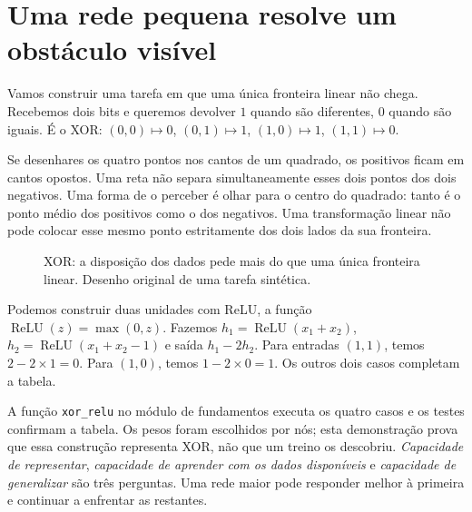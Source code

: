 \section{Uma rede pequena resolve um obstáculo visível}
Vamos construir uma tarefa em que uma única fronteira linear não chega. Recebemos dois bits e queremos devolver $1$ quando são diferentes, $0$ quando são iguais. É o XOR: $(0,0)\mapsto0$, $(0,1)\mapsto1$, $(1,0)\mapsto1$, $(1,1)\mapsto0$.

Se desenhares os quatro pontos nos cantos de um quadrado, os positivos ficam em cantos opostos. Uma reta não separa simultaneamente esses dois pontos dos dois negativos. Uma forma de o perceber é olhar para o centro do quadrado: tanto é o ponto médio dos positivos como o dos negativos. Uma transformação linear não pode colocar esse mesmo ponto estritamente dos dois lados da sua fronteira.

\begin{figure}[htbp]
\centering
{}
\caption{XOR: a disposição dos dados pede mais do que uma única fronteira linear. Desenho original de uma tarefa sintética.}
\end{figure}

Podemos construir duas unidades com ReLU, a função $\operatorname{ReLU}(z)=\max(0,z)$. Fazemos $h_1=\operatorname{ReLU}(x_1+x_2)$, $h_2=\operatorname{ReLU}(x_1+x_2-1)$ e saída $h_1-2h_2$. Para entradas $(1,1)$, temos $2-2\times1=0$. Para $(1,0)$, temos $1-2\times0=1$. Os outros dois casos completam a tabela.

A função \texttt{xor\_relu} no módulo de fundamentos executa os quatro casos e os testes confirmam a tabela. Os pesos foram escolhidos por nós; esta demonstração prova que essa construção representa XOR, não que um treino os descobriu. \emph{Capacidade de representar}, \emph{capacidade de aprender com os dados disponíveis} e \emph{capacidade de generalizar} são três perguntas. Uma rede maior pode responder melhor à primeira e continuar a enfrentar as restantes.

